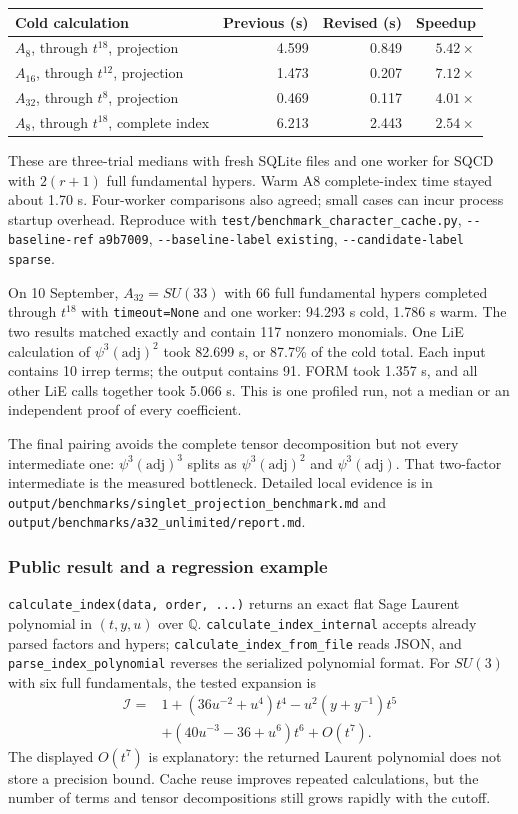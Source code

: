 \documentclass[11pt,a4paper]{article}
\numberwithin{equation}{section}
\newcommand{\code}[1]{{\small\nolinkurl{#1}}}
\newcommand{\adj}{\mathrm{adj}}
\newcommand{\QQ}{\mathbb Q}
\begin{document}
\begin{tabularx}{\textwidth}{@{}Yrrr@{}}
\toprule Cold calculation & Previous (s) & Revised (s) & Speedup\\\midrule
$A_8$, through $t^{18}$, projection & 4.599 & 0.849 & $5.42\times$\\
$A_{16}$, through $t^{12}$, projection & 1.473 & 0.207 & $7.12\times$\\
$A_{32}$, through $t^8$, projection & 0.469 & 0.117 & $4.01\times$\\
$A_8$, through $t^{18}$, complete index & 6.213 & 2.443 & $2.54\times$\\\bottomrule
\end{tabularx}
These are three-trial medians with fresh SQLite files and one worker for SQCD
with $2(r+1)$ full fundamental hypers. Warm A8 complete-index time stayed about
1.70 s. Four-worker comparisons also agreed; small cases can incur process
startup overhead. Reproduce with \code{test/benchmark_character_cache.py},
\code{--baseline-ref} \code{a9b7009}, \code{--baseline-label} \code{existing},
\code{--candidate-label} \code{sparse}.

On 10 September, $A_{32}=SU(33)$ with 66 full fundamental hypers completed through
$t^{18}$ with \code{timeout=None} and one worker: 94.293 s cold, 1.786 s warm.
The two results matched exactly and contain 117 nonzero monomials. One LiE
calculation of $\psi^3(\adj)^2$ took 82.699 s, or 87.7\% of the cold total.
Each input contains 10 irrep terms; the output contains 91. FORM took 1.357 s,
and all other LiE calls together took 5.066 s. This is one profiled run, not a
median or an independent proof of every coefficient.

The final pairing avoids the complete tensor decomposition but not every
intermediate one: $\psi^3(\adj)^3$ splits as $\psi^3(\adj)^2$ and
$\psi^3(\adj)$. That two-factor intermediate is the measured bottleneck.
Detailed local evidence is in \code{output/benchmarks/singlet_projection_benchmark.md}
and \code{output/benchmarks/a32_unlimited/report.md}.

\subsubsection{Public result and a regression example}
\code{calculate_index(data, order, ...)} returns an exact flat Sage Laurent
polynomial in $(t,y,u)$ over $\QQ$. \code{calculate_index_internal} accepts already
parsed factors and hypers; \code{calculate_index_from_file} reads JSON, and
\code{parse_index_polynomial} reverses the serialized polynomial format.
For $SU(3)$ with six full fundamentals, the tested expansion is
\begin{equation}
 \begin{split}
 \mathcal I={}&1+(36u^{-2}+u^4)t^4-u^2(y+y^{-1})t^5\\
 &+(40u^{-3}-36+u^6)t^6+O(t^7).
 \end{split}\label{eq:su3-full}
\end{equation}
The displayed $O(t^7)$ is explanatory: the returned Laurent polynomial does not
store a precision bound. Cache reuse improves repeated calculations, but the
number of terms and tensor decompositions still grows rapidly with the cutoff.
\end{document}
